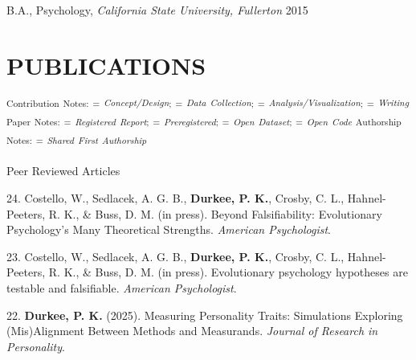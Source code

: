 \documentclass[10pt,]{article}
\begin{document}
B.A., Psychology, \emph{California State University, Fullerton}
\hfill \textcolor{light-gray}{2015}

\section{PUBLICATIONS}\label{publications}

\textsuperscript{Contribution} \textsuperscript{Notes:}
\textsuperscript{\faLightbulbO} \textsuperscript{=}
\emph{\textsuperscript{Concept/Design}}\textsuperscript{;}
\textsuperscript{\faTable} \textsuperscript{=}
\emph{\textsuperscript{Data}
\textsuperscript{Collection}}\textsuperscript{;}
\textsuperscript{\faBarChart} \textsuperscript{=}
\emph{\textsuperscript{Analysis/Visualization}}\textsuperscript{;}
\textsuperscript{\faPencil} \textsuperscript{=}
\emph{\textsuperscript{Writing}} \newline  \textsuperscript{Paper}
\textsuperscript{Notes:} \textsuperscript{\faRegistered}
\textsuperscript{=} \emph{\textsuperscript{Registered}
\textsuperscript{Report}}\textsuperscript{;}
\textsuperscript{\faCheckCircle} \textsuperscript{=}
\emph{\textsuperscript{Preregistered}}\textsuperscript{;}
\textsuperscript{\faDatabase} \textsuperscript{=}
\emph{\textsuperscript{Open}
\textsuperscript{Dataset}}\textsuperscript{;}
\textsuperscript{\faFileCodeO} \textsuperscript{=}
\emph{\textsuperscript{Open} \textsuperscript{Code}} \newline 
\textsuperscript{Authorship} \textsuperscript{Notes:}
\textsuperscript{\faUnsorted} \textsuperscript{=}
\emph{\textsuperscript{Shared} \textsuperscript{First}
\textsuperscript{Authorship}}

\textcolor{light-gray}{Peer Reviewed Articles}

24.\hangindent=0.5in \marginpar{\scriptsize{\faLightbulbO\faPencil}}
Costello, W., Sedlacek, A. G. B., \textbf{Durkee, P. K.}, Crosby, C. L.,
Hahnel-Peeters, R. K., \& Buss, D. M. (in press). Beyond Falsifiability:
Evolutionary Psychology's Many Theoretical Strengths. \emph{American
Psychologist}.

23.\hangindent=0.5in \marginpar{\scriptsize{\faLightbulbO\faPencil}}
Costello, W., Sedlacek, A. G. B., \textbf{Durkee, P. K.}, Crosby, C. L.,
Hahnel-Peeters, R. K., \& Buss, D. M. (in press). Evolutionary
psychology hypotheses are testable and falsifiable. \emph{American
Psychologist}.

22.\hangindent=0.5in
\marginpar{\scriptsize{\faLightbulbO\faBarChart\faPencil}}
\marginpar{\textsuperscript{\faDatabase \faFileCodeO}} \textbf{Durkee,
P. K.} (2025). Measuring Personality Traits: Simulations Exploring
(Mis)Alignment Between Methods and Measurands. \emph{Journal of Research
in Personality}.
\end{document}
